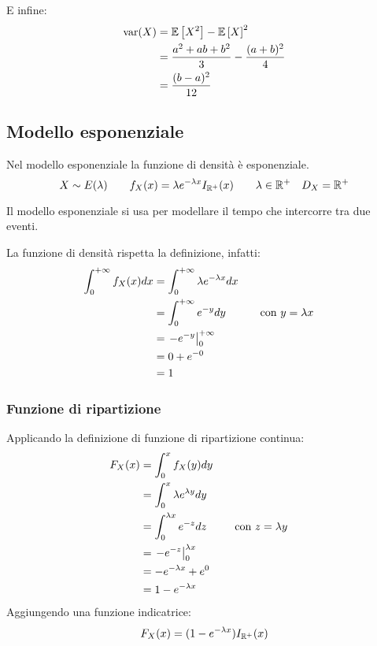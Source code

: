 E infine:
\begin{align*}
	\operatorname{var}(X) & = \mathbb{E}\left[ X^2 \right] - \mathbb{E}\left[ X \right]^2                      \\
	        & = \frac{a^2+ab+b^2}{3} - \frac{(a+b)^2}{4} \\
	        & = \frac{(b-a)^2}{12}
\end{align*}


\subsection{Modello esponenziale}
Nel modello esponenziale la funzione di densità è esponenziale.
\begin{equation*}
	X\sim E(\lambda) \qquad f_X(x) = \lambda e^{-\lambda x} I_{\mathbb R^+}(x) \qquad \lambda\in\mathbb R^+ \quad D_X=\mathbb R^+
\end{equation*}

Il modello esponenziale si usa per modellare il tempo che intercorre tra due eventi.

La funzione di densità rispetta la definizione, infatti:
\begin{align*}
	\int_0^{+\infty} f_X(x)dx & = \int_0^{+\infty} \lambda e^{-\lambda x} dx       \\
	                          & = \int_0^{+\infty} e^{-y}dy & \quad & \text{con $y=\lambda x$} \\
	                          & = \left. -e^{-y} \right\rvert_{0}^{+\infty}                       \\
	                          & = 0 + e^{-0}                                       \\
	                          & = 1
\end{align*}


\subsubsection{Funzione di ripartizione}
Applicando la definizione di funzione di ripartizione continua:
\begin{align*}
	F_X(x) & = \int_0^x f_X(y)dy                                  \\
	       & = \int_0^x \lambda e^{\lambda y}dy                   \\
	       & = \int_0^{\lambda x} e^{-z}dz & \quad & \text{con $z=\lambda y$} \\
	       & = \left. -e^{-z} \right\rvert_{0}^{\lambda x}                       \\
	       & = -e^{-\lambda x} + e^0                              \\
	       & = 1-e^{-\lambda x}
\end{align*}
Aggiungendo una funzione indicatrice:
\begin{equation}
	F_X(x) = (1 - e^{-\lambda x})I_{\mathbb R^+}(x)
\end{equation}


